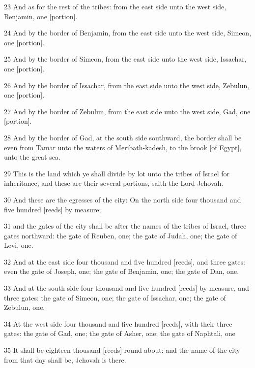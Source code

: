 \par 23 And as for the rest of the tribes: from the east side unto the west side, Benjamin, one [portion].
\par 24 And by the border of Benjamin, from the east side unto the west side, Simeon, one [portion].
\par 25 And by the border of Simeon, from the east side unto the west side, Issachar, one [portion].
\par 26 And by the border of Issachar, from the east side unto the west side, Zebulun, one [portion].
\par 27 And by the border of Zebulun, from the east side unto the west side, Gad, one [portion].
\par 28 And by the border of Gad, at the south side southward, the border shall be even from Tamar unto the waters of Meribath-kadesh, to the brook [of Egypt], unto the great sea.
\par 29 This is the land which ye shall divide by lot unto the tribes of Israel for inheritance, and these are their several portions, saith the Lord Jehovah.
\par 30 And these are the egresses of the city: On the north side four thousand and five hundred [reeds] by measure;
\par 31 and the gates of the city shall be after the names of the tribes of Israel, three gates northward: the gate of Reuben, one; the gate of Judah, one; the gate of Levi, one.
\par 32 And at the east side four thousand and five hundred [reeds], and three gates: even the gate of Joseph, one; the gate of Benjamin, one; the gate of Dan, one.
\par 33 And at the south side four thousand and five hundred [reeds] by measure, and three gates: the gate of Simeon, one; the gate of Issachar, one; the gate of Zebulun, one.
\par 34 At the west side four thousand and five hundred [reeds], with their three gates: the gate of Gad, one; the gate of Asher, one; the gate of Naphtali, one
\par 35 It shall be eighteen thousand [reeds] round about: and the name of the city from that day shall be, Jehovah is there.

